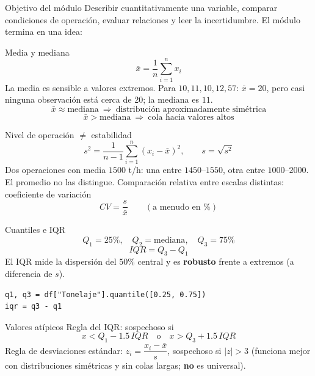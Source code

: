 



\begin{frame}{Objetivo del módulo}
Describir cuantitativamente una variable, comparar condiciones de operación,
evaluar relaciones y leer la incertidumbre. El módulo termina en una idea:
\vfill
{}
\vfill

\end{frame}

\begin{frame}{Media y mediana}
\[
\bar{x}=\frac{1}{n}\sum_{i=1}^{n}x_i
\]
La media es sensible a valores extremos. Para $10,11,10,12,57$: $\bar{x}=20$, pero
casi ninguna observación está cerca de 20; la mediana es $11$.
\vfill
\[
\bar{x}\approx\text{mediana}\ \Rightarrow\ \text{distribución aproximadamente simétrica}
\]
\[
\bar{x}>\text{mediana}\ \Rightarrow\ \text{cola hacia valores altos}
\]
\end{frame}

\begin{frame}{Nivel de operación $\neq$ estabilidad}
\[
s^2=\frac{1}{n-1}\sum_{i=1}^{n}(x_i-\bar{x})^2,\qquad s=\sqrt{s^2}
\]
Dos operaciones con media $1500$ t/h: una entre $1450$--$1550$, otra entre $1000$--$2000$.
El promedio no las distingue.
\vfill
Comparación relativa entre escalas distintas: coeficiente de variación
\[
CV=\frac{s}{\bar{x}}\qquad (\text{a menudo en \%})
\]
\end{frame}

\begin{frame}[fragile]{Cuantiles e IQR}
\[
Q_1=25\%,\quad Q_2=\text{mediana},\quad Q_3=75\%
\]
\[
IQR=Q_3-Q_1
\]
El IQR mide la dispersión del $50\%$ central y es \textbf{robusto} frente a extremos
(a diferencia de $s$).
\vfill
\begin{lstlisting}
q1, q3 = df["Tonelaje"].quantile([0.25, 0.75])
iqr = q3 - q1
\end{lstlisting}
\end{frame}

\begin{frame}{Valores atípicos}
Regla del IQR: sospechoso si
\[
x<Q_1-1.5\,IQR \quad\text{o}\quad x>Q_3+1.5\,IQR
\]
Regla de desviaciones estándar: $z_i=\dfrac{x_i-\bar{x}}{s}$, sospechoso si $|z|>3$
(funciona mejor con distribuciones simétricas y sin colas largas; \textbf{no} es universal).
\end{frame}

